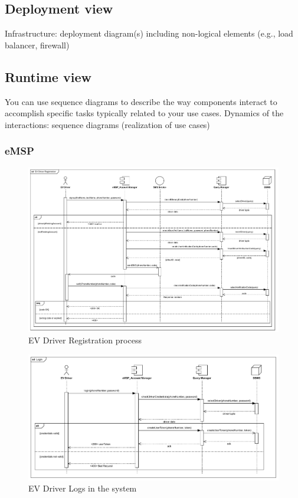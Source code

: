 \subsection{Deployment view}
Infrastructure: deployment diagram(s) including non-logical elements (e.g., load balancer, firewall)

\subsection{Runtime view}
You can use sequence diagrams to describe the way components interact to accomplish specific tasks typically related to your use cases. Dynamics of the interactions: sequence
diagrams (realization of use cases)

\subsubsection{eMSP}
\begin{figure}[H]
    \centering
    \includegraphics[scale=0.55]{src/runtimeVIew/eMSP_Registration.pdf}
    \caption{EV Driver Registration process}
\end{figure}

\begin{figure}[H]
    \centering
    \includegraphics[scale=0.55]{src/runtimeVIew/eMSP_Login.pdf}
    \caption{EV Driver Logs in the system}
\end{figure}

